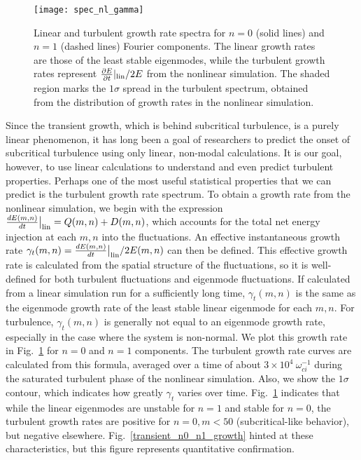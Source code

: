 \documentclass[letter,scriptaddress,twocolumn, prl,showkeys]{revtex4}
\newcommand{\diff}[2]{\frac{d#1}{d#2}}
\newcommand{\pdiff}[2]{\frac{\partial#1}{\partial#2}}
\begin{document}
\begin{figure}
\centerline{\texttt{[image: spec\_nl\_gamma]}}
\caption{Linear and turbulent growth rate spectra for $n=0$ (solid lines) and $n=1$ (dashed lines) Fourier components. The linear growth rates are those of the least stable eigenmodes,
while the turbulent growth rates represent $\pdiff{E}{t}|_{\rm{lin}}/2 E$ from the nonlinear simulation. The shaded region marks the $1 \sigma$ spread in the turbulent spectrum,
obtained from the distribution of growth rates in the nonlinear simulation.}
\label{spec_nl_gamma}
\end{figure}

Since the transient growth, which is behind subcritical turbulence, is a purely linear phenomenon, it has long been a goal of researchers to predict the onset of subcritical turbulence using
only linear, non-modal calculations. It is our goal, however, to use linear calculations to understand and even predict turbulent properties.
Perhaps one of the most useful statistical properties that we can predict is the turbulent growth rate spectrum.
To obtain a growth rate from the nonlinear simulation, we begin with the expression $\diff{E(m,n)}{t}\big|_{\rm{lin}} = Q(m,n) + D(m,n)$, 
which accounts for the total net energy injection at each $m,n$ into the fluctuations. 
An effective instantaneous growth rate $\gamma_t(m,n) = \diff{E(m,n)}{t}\big|_{\rm{lin}}/ 2 E(m,n)$ can then be defined. 
This effective growth rate is calculated from the spatial structure of the fluctuations, so it is well-defined for both turbulent fluctuations and eigenmode fluctuations. If calculated
from a linear simulation run for a sufficiently long time, $\gamma_t(m,n)$ is the same as the eigenmode growth rate of the least stable linear eigenmode for each $m,n$.
For turbulence, $\gamma_t(m,n)$ is generally not equal to an eigenmode growth rate, especially in the case where the system is non-normal.
We plot this growth rate in Fig.~\ref{spec_nl_gamma} for $n=0$ and $n=1$ components. The turbulent growth rate curves are calculated from this formula, 
averaged over a time of about $3 \times 10^{4} \ \omega_{ci}^{-1}$ during the saturated turbulent phase of the nonlinear simulation.
Also, we show the $1 \sigma$ contour, which indicates how greatly $\gamma_t$ varies over time.
Fig.~\ref{spec_nl_gamma} indicates that while the linear eigenmodes are unstable for $n=1$ and stable for $n=0$,
the turbulent growth rates are positive for $n=0, m<50$ (subcritical-like behavior), but negative elsewhere. 
Fig.~\ref{transient_n0_n1_growth} hinted at these characteristics, but this figure represents quantitative confirmation.
\end{document}
